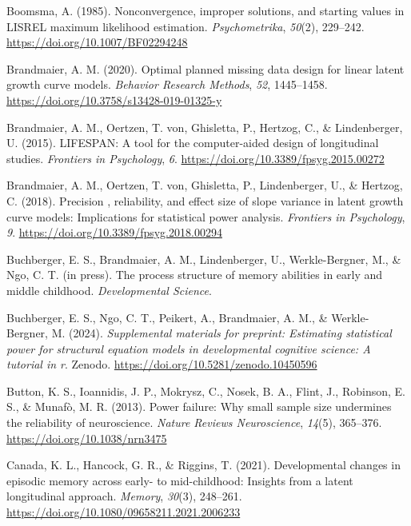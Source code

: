 \documentclass[
  man,floatsintext]{apa6}
\newlength{\cslhangindent}
\newlength{\cslentryspacingunit} %
\newenvironment{CSLReferences}[2] %
 {%
  \setlength{\parindent}{0pt}
  \ifodd #1
  \let\oldpar\par
  \def\par{\hangindent=\cslhangindent\oldpar}
  \fi
  \setlength{\parskip}{#2\cslentryspacingunit}
 }%
 {}
\begin{document}
\begin{CSLReferences}{1}{0}
\leavevmode{}%
Boomsma, A. (1985). Nonconvergence, improper solutions, and starting values in {LISREL} maximum likelihood estimation. \emph{Psychometrika}, \emph{50}(2), 229--242. \url{https://doi.org/10.1007/BF02294248}

\leavevmode{}%
Brandmaier, A. M. (2020). Optimal planned missing data design for linear latent growth curve models. \emph{Behavior Research Methods}, \emph{52}, 1445--1458. \url{https://doi.org/10.3758/s13428-019-01325-y}

\leavevmode{}%
Brandmaier, A. M., Oertzen, T. von, Ghisletta, P., Hertzog, C., \& Lindenberger, U. (2015). {LIFESPAN}: A tool for the computer-aided design of longitudinal studies. \emph{Frontiers in Psychology}, \emph{6}. \url{https://doi.org/10.3389/fpsyg.2015.00272}

\leavevmode{}%
Brandmaier, A. M., Oertzen, T. von, Ghisletta, P., Lindenberger, U., \& Hertzog, C. (2018). Precision , reliability, and effect size of slope variance in latent growth curve models: Implications for statistical power analysis. \emph{Frontiers in Psychology}, \emph{9}. \url{https://doi.org/10.3389/fpsyg.2018.00294}

\leavevmode{}%
Buchberger, E. S., Brandmaier, A. M., Lindenberger, U., Werkle-Bergner, M., \& Ngo, C. T. (in press). The process structure of memory abilities in early and middle childhood. \emph{Developmental Science}.

\leavevmode{}%
Buchberger, E. S., Ngo, C. T., Peikert, A., Brandmaier, A. M., \& Werkle-Bergner, M. (2024). \emph{Supplemental materials for preprint: Estimating statistical power for structural equation models in developmental cognitive science: A tutorial in r}. Zenodo. \url{https://doi.org/10.5281/zenodo.10450596}

\leavevmode{}%
Button, K. S., Ioannidis, J. P., Mokrysz, C., Nosek, B. A., Flint, J., Robinson, E. S., \& Munafò, M. R. (2013). Power failure: Why small sample size undermines the reliability of neuroscience. \emph{Nature Reviews Neuroscience}, \emph{14}(5), 365--376. \url{https://doi.org/10.1038/nrn3475}

\leavevmode{}%
Canada, K. L., Hancock, G. R., \& Riggins, T. (2021). Developmental changes in episodic memory across early- to mid-childhood: Insights from a latent longitudinal approach. \emph{Memory}, \emph{30}(3), 248--261. \url{https://doi.org/10.1080/09658211.2021.2006233}


\end{CSLReferences}
\end{document}
